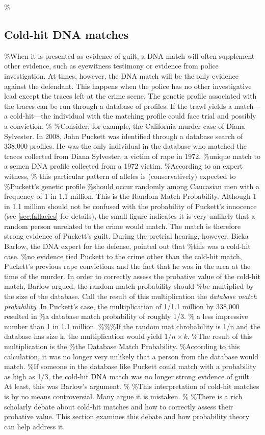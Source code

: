 \documentclass[10pt,dvipsnames,enabledeprecatedfontcommands]{scrartcl}
\begin{document}
\%\subsection{Cold-hit DNA matches}

\%When it is presented as evidence of guilt, a DNA match will often
supplement other evidence, such as eyewitness testimony or evidence from
police investigation. At times, however, the DNA match will be the only
evidence against the defendant. This happens when the police has no
other investigative lead except the traces left at the crime scene. The
genetic profile associated with the traces can be run through a database
of profiles. If the trawl yields a match---a cold-hit---the individual
with the matching profile could face trial and possibly a conviction. \%
\%Consider, for example, the California murder case of Diana Sylvester.
In 2008, John Puckett was identified through a database search of
338,000 profiles. He was the only individual in the database who matched
the traces collected from Diana Sylvester, a victim of rape in 1972.
\%unique match to a semen DNA profile collected from a 1972 victim.
\%According to an expert witness, \% this particular pattern of alleles
is (conservatively) expected to \%Puckett's genetic profile \%should
occur randomly among Caucasian men with a frequency of 1 in 1.1 million.
This is the Random Match Probability. Although 1 in 1.1 million should
not be confused with the probability of Puckett's innocence (see
\ref{sec:fallacies} for details), the small figure indicates it is very
unlikely that a random person unrelated to the crime would match. The
match is therefore strong evidence of Puckett's guilt. During the
pretrial hearing, however, Bicka Barlow, the DNA expert for the defense,
pointed out that \%this was a cold-hit case. \%no evidence tied Puckett
to the crime other than the cold-hit match, Puckett's previous rape
convictions and the fact that he was in the area at the time of the
murder. In order to correctly assess the probative value of the cold-hit
match, Barlow argued, the random match probability should \%be
multiplied by the size of the database. Call the result of this
multiplication the \textit{database match probability}. In Puckett's
case, the multiplication of 1/1.1 million by 338,000 resulted in \%a
database match probability of roughly 1/3. \% a less impressive number
than 1 in 1.1 million. \%\%\%If the random mat chrobability is 1/n and
the database has size k, the multiplication would yield \(1/n\times k\).
\%The result of this multiplication is the \%the Database Match
Probability. \%According to this calculation, it was no longer very
unlikely that a person from the database would match. \%If someone in
the database like Puckett could match with a probability as high as 1/3,
the cold-hit DNA match was no longer strong evidence of guilt. At least,
this was Barlow's argument. \% \%This interpretation of cold-hit matches
is by no means controversial. Many argue it is mistaken. \% \%There is a
rich scholarly debate about cold-hit matches and how to correctly assess
their probative value. This section examines this debate and how
probability theory can help address it.
\end{document}
